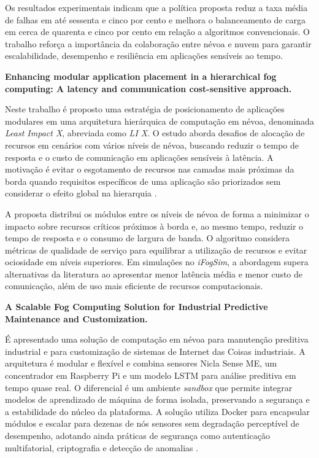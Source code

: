 Os resultados experimentais indicam que a política proposta reduz a taxa média de falhas em até sessenta e cinco por cento e melhora o balanceamento de carga em cerca de quarenta e cinco por cento em relação a algoritmos convencionais. O trabalho reforça a importância da colaboração entre névoa e nuvem para garantir escalabilidade, desempenho e resiliência em aplicações sensíveis ao tempo.

\textbf{Enhancing modular application placement in a hierarchical fog computing: A latency and communication cost-sensitive approach.}

Neste trabalho é proposto uma estratégia de posicionamento de aplicações modulares em uma arquitetura hierárquica de computação em névoa, denominada \textit{Least Impact X}, abreviada como \textit{LI X}. O estudo aborda desafios de alocação de recursos em cenários com vários níveis de névoa, buscando reduzir o tempo de resposta e o custo de comunicação em aplicações sensíveis à latência. A motivação é evitar o esgotamento de recursos nas camadas mais próximas da borda quando requisitos específicos de uma aplicação são priorizados sem considerar o efeito global na hierarquia \cite{oliveira2024}.

A proposta distribui os módulos entre os níveis de névoa de forma a minimizar o impacto sobre recursos críticos próximos à borda e, ao mesmo tempo, reduzir o tempo de resposta e o consumo de largura de banda. O algoritmo considera métricas de qualidade de serviço para equilibrar a utilização de recursos e evitar ociosidade em níveis superiores. Em simulações no \textit{iFogSim}, a abordagem supera alternativas da literatura ao apresentar menor latência média e menor custo de comunicação, além de uso mais eficiente de recursos computacionais.

\textbf{A Scalable Fog Computing Solution for Industrial Predictive Maintenance and Customization.}

É apresentado uma solução de computação em névoa para manutenção preditiva industrial e para customização de sistemas de Internet das Coisas industriais. A arquitetura é modular e flexível e combina sensores Nicla Sense ME, um concentrador em Raspberry Pi e um modelo \gls{LSTM} para análise preditiva em tempo quase real. O diferencial é um ambiente \textit{sandbox} que permite integrar modelos de aprendizado de máquina de forma isolada, preservando a segurança e a estabilidade do núcleo da plataforma. A solução utiliza Docker para encapsular módulos e escalar para dezenas de nós sensores sem degradação perceptível de desempenho, adotando ainda práticas de segurança como autenticação multifatorial, criptografia e detecção de anomalias \cite{dagostino2025}.


